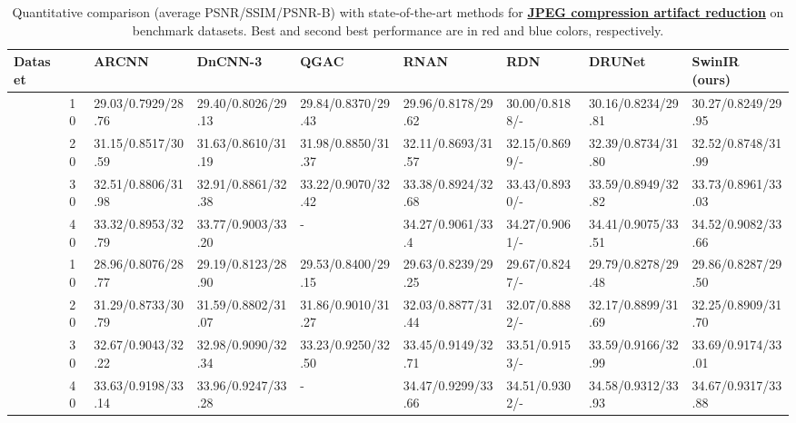\documentclass[10pt,twocolumn,letterpaper]{article}
\newcommand{\R}[1]{\textcolor[rgb]{1.00,0.00,0.00}{#1}}
\newcommand{\B}[1]{\textcolor[rgb]{0.00,0.00,1.00}{#1}}
\newlength \g
\begin{document}
\begin{table*}[h]\scriptsize
\center
\begin{center}
\caption{Quantitative comparison (average PSNR/SSIM/PSNR-B) with state-of-the-art methods for \textbf{\underline{JPEG compression artifact reduction}} on benchmark datasets. Best and second best performance are in \R{red} and \B{blue} colors, respectively.}
\vspace{-2mm}
\label{tab:car_results}
\begin{tabular}
{|p{0.7cm}<{\centering}|p{0.2cm}<{\centering}|p{1.85cm}<{\centering}|p{1.85cm}<{\centering}|p{1.85cm}<{\centering}|p{1.85cm}<{\centering}|p{1.45cm}<{\centering}|p{1.85cm}<{\centering}|p{1.85cm}<{\centering}|}
\hline
Dataset &  
& ARCNN~\cite{dong2015compression} 
& DnCNN-3~\cite{zhang2017DnCNN} 
& QGAC~\cite{ehrlich2020quantization}
& RNAN~\cite{zhang2019RNAN}
& RDN~\cite{zhang2020RDNIR}
& DRUNet~\cite{zhang2021DPIR}
& \textbf{SwinIR} (ours)\\
\hline
\hline
{} & 10
& 29.03/0.7929/28.76
& 29.40/0.8026/29.13
& 29.84/0.8370/29.43
& 29.96/0.8178/29.62
& 30.00/0.8188/-
& \B{30.16/0.8234/29.81}
& \R{30.27/0.8249/29.95}
\\
& 20
& 31.15/0.8517/30.59
& 31.63/0.8610/31.19
& 31.98/0.8850/31.37
& 32.11/0.8693/31.57
& 32.15/0.8699/-
& \B{32.39/0.8734/31.80}
& \R{32.52/0.8748/31.99}
\\
& 30
& 32.51/0.8806/31.98
& 32.91/0.8861/32.38
& 33.22/0.9070/32.42
& 33.38/0.8924/32.68
& 33.43/0.8930/-
& \B{33.59/0.8949/32.82}
& \R{33.73/0.8961/33.03}
\\
& 40
& 33.32/0.8953/32.79
& 33.77/0.9003/33.20
& -
& 34.27/0.9061/33.4
& 34.27/0.9061/-
& \B{34.41/0.9075/33.51}
& \R{34.52/0.9082/33.66}
\\
\hline
{} & 10
& 28.96/0.8076/28.77
& 29.19/0.8123/28.90
& 29.53/0.8400/29.15 
& 29.63/0.8239/29.25
& 29.67/0.8247/-
& \B{29.79/0.8278/29.48}
& \R{29.86/0.8287/29.50}
\\
& 20
& 31.29/0.8733/30.79
& 31.59/0.8802/31.07
& 31.86/0.9010/31.27
& 32.03/0.8877/31.44
& 32.07/0.8882/-
& \B{32.17/0.8899/31.69}
& \R{32.25/0.8909/31.70}
\\
& 30
& 32.67/0.9043/32.22
& 32.98/0.9090/32.34
& 33.23/0.9250/32.50
& 33.45/0.9149/32.71
& 33.51/0.9153/-
& \B{33.59/0.9166/32.99}
& \R{33.69/0.9174/33.01}
\\
& 40
& 33.63/0.9198/33.14
& 33.96/0.9247/33.28
& -
& 34.47/0.9299/33.66
& 34.51/0.9302/-
& \B{34.58/0.9312/}\R{33.93}
& \R{34.67/0.9317/}\B{33.88}
\\
\hline             
\end{tabular}
\end{center}
\vspace{-2mm}
\end{table*}
\end{document}
